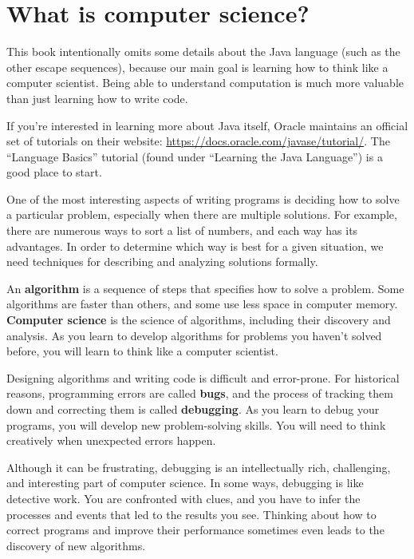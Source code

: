\section{What is computer science?}

This book intentionally omits some details about the Java language (such as the other escape sequences), because our main goal is learning how to think like a computer scientist.
Being able to understand computation is much more valuable than just learning how to write code.

If you're interested in learning more about Java itself, Oracle maintains an official set of tutorials on their website: \url{https://docs.oracle.com/javase/tutorial/}.
The ``Language Basics'' tutorial (found under ``Learning the Java Language'') is a good place to start.

One of the most interesting aspects of writing programs is deciding how to solve a particular problem, especially when there are multiple solutions.
For example, there are numerous ways to sort a list of numbers, and each way has its advantages.
In order to determine which way is best for a given situation, we need techniques for describing and analyzing solutions formally.


An {\bf algorithm} is a sequence of steps that specifies how to solve a problem.
Some algorithms are faster than others, and some use less space in computer memory.
{\bf Computer science} is the science of algorithms, including their discovery and analysis.
As you learn to develop algorithms for problems you haven't solved before, you will learn to think like a computer scientist.


Designing algorithms and writing code is difficult and error-prone.
For historical reasons, programming errors are called {\bf bugs}, and the process of tracking them down and correcting them is called {\bf debugging}.
As you learn to debug your programs, you will develop new problem-solving skills.
You will need to think creatively when unexpected errors happen.

Although it can be frustrating, debugging is an intellectually rich, challenging, and interesting part of computer science.
In some ways, debugging is like detective work.
You are confronted with clues, and you have to infer the processes and events that led to the results you see.
Thinking about how to correct programs and improve their performance sometimes even leads to the discovery of new algorithms.



